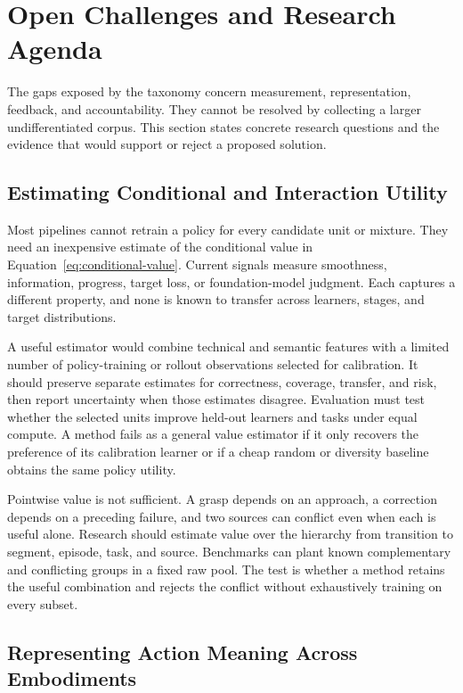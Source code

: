 \section{Open Challenges and Research Agenda}
\label{sec:agenda}

The gaps exposed by the taxonomy concern measurement, representation, feedback, and accountability. They cannot be resolved by collecting a larger undifferentiated corpus. This section states concrete research questions and the evidence that would support or reject a proposed solution.

\subsection{Estimating Conditional and Interaction Utility}

Most pipelines cannot retrain a policy for every candidate unit or mixture. They need an inexpensive estimate of the conditional value in Equation~\ref{eq:conditional-value}. Current signals measure smoothness, information, progress, target loss, or foundation-model judgment. Each captures a different property, and none is known to transfer across learners, stages, and target distributions.

A useful estimator would combine technical and semantic features with a limited number of policy-training or rollout observations selected for calibration. It should preserve separate estimates for correctness, coverage, transfer, and risk, then report uncertainty when those estimates disagree. Evaluation must test whether the selected units improve held-out learners and tasks under equal compute. A method fails as a general value estimator if it only recovers the preference of its calibration learner or if a cheap random or diversity baseline obtains the same policy utility.

Pointwise value is not sufficient. A grasp depends on an approach, a correction depends on a preceding failure, and two sources can conflict even when each is useful alone. Research should estimate value over the hierarchy from transition to segment, episode, task, and source. Benchmarks can plant known complementary and conflicting groups in a fixed raw pool. The test is whether a method retains the useful combination and rejects the conflict without exhaustively training on every subset.

\subsection{Representing Action Meaning Across Embodiments}

